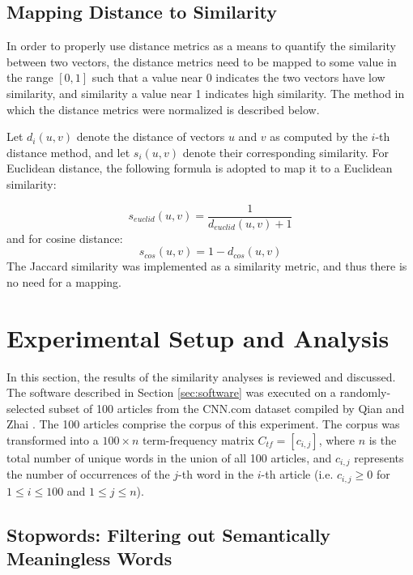 \documentclass[11pt]{article}
\begin{document}
\subsection{Mapping Distance to Similarity} \label{sec:mapping}

In order to properly use distance metrics as a means to quantify the similarity between two vectors, the distance metrics need to be mapped to some value in the range $[0, 1]$ such that a value near 0 indicates the two vectors have low similarity, and similarity a value near 1 indicates high similarity.
The method in which the distance metrics were normalized is described below.

Let $d_i(u, v)$ denote the distance of vectors $u$ and $v$ as computed by the $i$-th distance method, and let $s_i(u, v)$ denote their corresponding similarity.
For Euclidean distance, the following formula is adopted to map it to a Euclidean similarity:

\begin{equation} \label{eq:euclid}
s_{euclid}(u, v) = \frac{1}{d_{euclid}(u, v) + 1}
\end{equation}
and for cosine distance:
\begin{equation} \label{eq:cosine}
s_{cos}(u, v) = 1 - d_{cos}(u, v)
\end{equation}
The Jaccard similarity was implemented as a similarity metric, and thus there is no need for a mapping.


\section{Experimental Setup and Analysis}

In this section, the results of the similarity analyses is reviewed and discussed.
The software described in Section \ref{sec:software} was executed on a randomly-selected subset of 100 articles from the CNN.com dataset compiled by Qian and Zhai \cite{qian2014unsupervised}.
The 100 articles comprise the corpus of this experiment.
The corpus was transformed into a $100 \times n$ term-frequency matrix $C_{tf} = [ c_{i,j} ]$, where $n$ is the total number of unique words in the union of all 100 articles, and $c_{i,j}$ represents the number of occurrences of the $j$-th word in the $i$-th article (i.e. $c_{i,j} \ge 0$ for $1 \le i \le 100$ and $1 \le j \le n$).

\subsection{Stopwords: Filtering out Semantically Meaningless Words}
\end{document}
